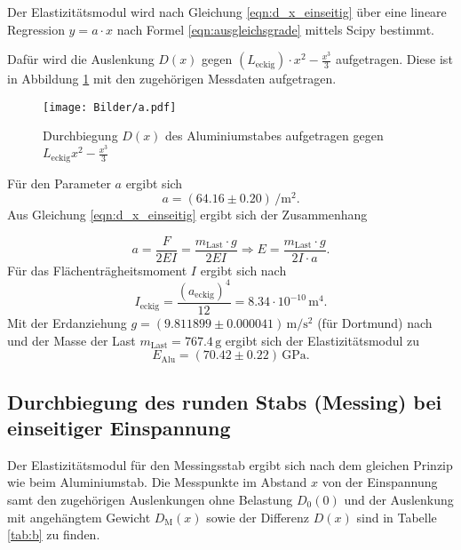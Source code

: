 Der Elastizitätsmodul wird nach Gleichung \eqref{eqn:d_x_einseitig} über eine lineare Regression $y= a\cdot x$ nach Formel \eqref{eqn:ausgleichsgrade} mittels Scipy \cite{scipy} bestimmt.

Dafür wird die Auslenkung $D(x)$ gegen $(L_{\mathrm{eckig}})\cdot x^2-\frac{x^3}{3}$ aufgetragen.
Diese ist in Abbildung \ref{fig:Alu_einseitig} mit den zugehörigen Messdaten aufgetragen.
\begin{figure}
	\centering
	\texttt{[image: Bilder/a.pdf]}
	\caption{Durchbiegung $D(x)$ des Aluminiumstabes aufgetragen gegen $L_{\mathrm{eckig}}x^2-\frac{x^3}{3}$}
	\label{fig:Alu_einseitig}
\end{figure}

Für den Parameter $a$ ergibt sich
\begin{equation*}
	a=(64.16\pm 0.20) \,\si{\per\square\meter}  \text{.}
\end{equation*}
Aus Gleichung \eqref{eqn:d_x_einseitig} ergibt sich der Zusammenhang

\begin{equation}
	a= \frac{F}{2EI}=\frac{m_{\mathrm{Last}}\cdot g}{2EI} \Rightarrow E=\frac{m_{\mathrm{Last}}\cdot g}{2I\cdot a} \text{.}
\end{equation}
Für das Flächenträgheitsmoment $I$ ergibt sich nach \cite{bla}
\begin{equation}
	I_{\mathrm{eckig}}=\frac{(a_{\mathrm{eckig}})^4}{12}= 8.34 \cdot 10^{-10} \,\si{\meter\tothe{4}}	 \text{.}
\end{equation}
Mit der Erdanziehung $g=(9.811899 \pm 0.000041) \,\si{\meter\per\square\second}$ (für Dortmund) nach \cite{G} und der Masse der Last $m_{\mathrm{Last}}=767.4\,\si{\gram}$ ergibt sich der Elastizitätsmodul zu
\begin{equation*}
	E_{\mathrm{Alu}}= (70.42 \pm 0.22)\,\si{\giga\pascal} \text{.}
\end{equation*}
\FloatBarrier
\subsection{Durchbiegung des runden Stabs (Messing) bei einseitiger Einspannung}
Der Elastizitätsmodul für den Messingsstab ergibt sich nach dem gleichen Prinzip wie beim Aluminiumstab.
Die Messpunkte im Abstand $x$ von der Einspannung samt den zugehörigen Auslenkungen ohne Belastung $D_{\mathrm{0}}(0)$
und der Auslenkung mit angehängtem Gewicht $D_{\mathrm{M}}(x)$ sowie der Differenz $D(x)$ sind
in Tabelle \ref{tab:b} zu finden.

